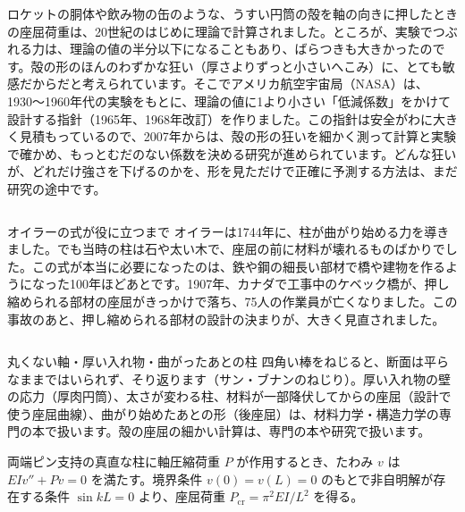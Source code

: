 \begin{phmada}
ロケットの胴体や飲み物の缶のような、うすい円筒の殻を軸の向きに押したときの座屈荷重は、20世紀のはじめに理論で計算されました。ところが、実験でつぶれる力は、理論の値の半分以下になることもあり、ばらつきも大きかったのです。殻の形のほんのわずかな狂い（厚さよりずっと小さいへこみ）に、とても敏感だからだと考えられています。そこでアメリカ航空宇宙局（NASA）は、1930〜1960年代の実験をもとに、理論の値に1より小さい「低減係数」をかけて設計する指針（1965年、1968年改訂）を作りました。この指針は安全がわに大きく見積もっているので、2007年からは、殻の形の狂いを細かく測って計算と実験で確かめ、もっとむだのない係数を決める研究が進められています。どんな狂いが、どれだけ強さを下げるのかを、形を見ただけで正確に予測する方法は、まだ研究の途中です。
\end{phmada}

\begin{column}{オイラーの式が役に立つまで}
オイラーは1744年に、柱が曲がり始める力を導きました。でも当時の柱は石や太い木で、座屈の前に材料が壊れるものばかりでした。この式が本当に必要になったのは、鉄や鋼の細長い部材で橋や建物を作るようになった100年ほどあとです。1907年、カナダで工事中のケベック橋が、押し縮められる部材の座屈がきっかけで落ち、75人の作業員が亡くなりました。この事故のあと、押し縮められる部材の設計の決まりが、大きく見直されました。
\end{column}

\begin{phsaki}{丸くない軸・厚い入れ物・曲がったあとの柱}
四角い棒をねじると、断面は平らなままではいられず、そり返ります（サン・ブナンのねじり）。厚い入れ物の壁の応力（厚肉円筒）、太さが変わる柱、材料が一部降伏してからの座屈（設計で使う座屈曲線）、曲がり始めたあとの形（後座屈）は、材料力学・構造力学の専門の本で扱います。殻の座屈の細かい計算は、専門の本や研究で扱います。
\end{phsaki}

\begin{senmonsho}[材料力学の教科書ふうの書き方]
\begin{bkhonbun}
両端ピン支持の真直な柱に軸圧縮荷重 $P$ が作用するとき、たわみ $v$ は $EIv''+Pv=0$ を満たす。境界条件 $v(0)=v(L)=0$ のもとで非自明解が存在する条件 $\sin kL=0$ より、座屈荷重 $P_{\mathrm{cr}}=\pi^2EI/L^2$ を得る。
\end{bkhonbun}
\end{senmonsho}

